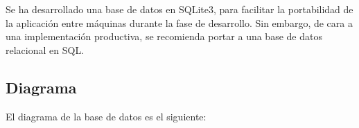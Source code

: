Se ha desarrollado una base de datos en SQLite3\cite{sqlite}, para facilitar la portabilidad de la aplicación entre máquinas durante la fase de desarrollo. Sin embargo, de cara a una implementación productiva, se recomienda portar a una base de datos relacional en SQL.

\subsection*{Diagrama}
El diagrama de la base de datos es el siguiente:
